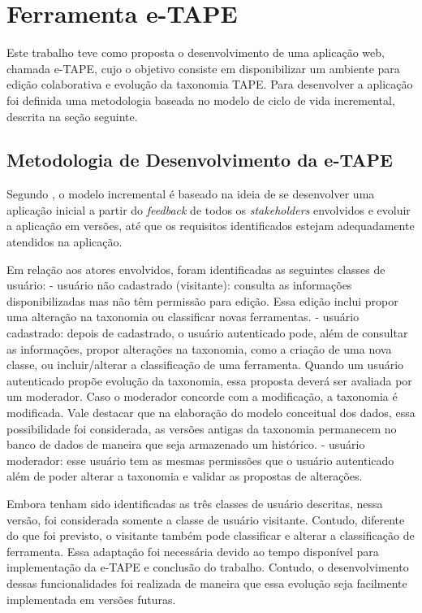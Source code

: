 \chapter[Ferramenta]{Ferramenta e-TAPE}
\label{cap:cap3}
Este trabalho teve como proposta o desenvolvimento de uma aplicação web, chamada e-TAPE, cujo o objetivo consiste em disponibilizar um ambiente para edição colaborativa e evolução da taxonomia TAPE.
Para desenvolver a aplicação foi definida uma metodologia baseada no modelo de ciclo de vida incremental, descrita na seção seguinte.

\section {Metodologia de Desenvolvimento da e-TAPE}
\label{sec:desenvolvimento}
\par
Segundo , o modelo incremental é baseado na ideia de se desenvolver uma aplicação inicial a partir do \textit{feedback} de todos os \textit{stakeholders} envolvidos e evoluir a aplicação em versões, até que os requisitos identificados estejam adequadamente atendidos na aplicação. 

\par
Em relação aos atores envolvidos, foram identificadas as seguintes classes de usuário:
- usuário não cadastrado (visitante): consulta as informações disponibilizadas mas não têm permissão para edição. Essa edição inclui propor uma alteração na taxonomia ou classificar novas ferramentas.
- usuário cadastrado: depois de cadastrado, o usuário autenticado pode, além de consultar as informações, propor alterações na taxonomia,  como a criação de uma nova classe, ou incluir/alterar a
classificação de uma ferramenta. Quando um usuário autenticado propõe evolução da taxonomia, essa proposta deverá ser avaliada por um moderador. Caso o moderador concorde com a modificação,  a taxonomia é modificada. Vale destacar que na elaboração do modelo conceitual dos dados, essa possibilidade foi considerada, as versões antigas da taxonomia permanecem no banco de dados de maneira que seja armazenado
um histórico. 
- usuário moderador: esse usuário tem as mesmas permissões que o usuário autenticado além de poder alterar a taxonomia e validar as propostas de alterações. 

\par
Embora tenham sido identificadas as três classes de usuário descritas, nessa versão, foi considerada somente a classe de usuário visitante.
Contudo, diferente do que foi previsto, o visitante também pode classificar e alterar a classificação de ferramenta. Essa adaptação foi necessária devido ao tempo disponível para implementação da e-TAPE
e conclusão do trabalho. Contudo, o desenvolvimento dessas funcionalidades foi realizada de maneira que essa evolução seja facilmente implementada em versões futuras.


